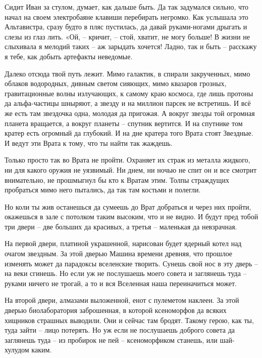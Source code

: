 \documentclass[ebook,oneside,final,openright]{memoir}
\begin{document}
\par
Сидит Иван за стулом, думает, как дальше быть. Да так задумался сильно, что начал на своем электробаяне клавиши перебирать негромко. Как услышала это Альтавистра, сразу будто в пляс пустилась, да давай руками-ногами дрыгать и слезы из глаз лить. «Ой, – кричит, – стой, хватит, не могу больше! В жизни не слыхивала я мелодий таких – аж зарыдать хочется! Ладно, так и быть – расскажу я тебе, как добыть артефакты неведомые.\par
\par
Далеко отсюда твой путь лежит. Мимо галактик, в спирали закрученных, мимо облаков водородных, дивным светом сияющих, мимо квазаров грозных, гравитационные волны излучающих, к самому краю космоса, где лишь протоны да альфа-частицы шныряют, а звезду и на миллион парсек не встретишь. И всё же есть там звездочка одна, молодая да пригожая. А вокруг звезды той огромная планета вращается, а вокруг планеты – спутник вертится. И на спутнике том кратер есть огромный да глубокий. И на дне кратера того Врата стоят Звездные. И ведут эти Врата к тому, что ты найти так жаждешь.\par
\par
Только просто так во Врата не пройти. Охраняет их страж из металла жидкого, ни для какого оружия не уязвимый. Ни днем, ни ночью не спит он и все смотрит внимательно, не прошмыгнул бы кто к Вратам этим. Толпы страждущих пробраться мимо него пытались, да так там костьми и полегли.\par
\par
Но коли ты жив останешься да сумеешь до Врат добраться и через них пройти, окажешься в зале с потолком таким высоким, что и не видно. И будут пред тобой три двери – две больших да красивых, а третья – маленькая да невзрачная.\par
\par
На первой двери, платиной украшенной, нарисован будет ядерный котел над очагом звездным. За этой дверью Машина времени древняя, что прошлое изменять может да парадоксы вселенские творить. Сунешь свой нос в эту дверь – на веки сгинешь. Но если уж не послушаешь моего совета и заглянешь туда – руками ничего не трогай, а то и вся Вселенная наша переиначиться может.\par
\par
На второй двери, алмазами выложенной, енот с пулеметом наклеен. За этой дверью биолаборатория заброшенная, в которой ксеноморфов да всяких хищников страшных выводили. Они и сейчас там бродят. Такому герою, как ты, туда зайти – лицо потерять. Но уж если не послушаешь доброго совета да заглянешь туда – из пробирок не пей – ксеноморфиком станешь, или шай-хулудом каким.\par
\end{document}
